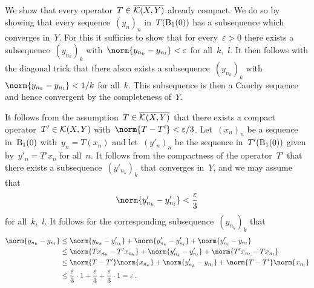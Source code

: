 \section{}





\subsection{}

We show that every operator~$T \in \overline{ \mathcal{K}(X,Y) }$ already compact.
We do so by showing that every sequence~$(y_n)_n$ in~$T(\operatorname{B}_{1}(0))$ has a subsequence which converges in~$Y$.
For this it sufficies to show that for every~$\varepsilon > 0$ there exists a subsequence~$(y_{n_k})_k$ with~$\norm{y_{n_k} - y_{n_l}} < \varepsilon$ for all~$k$,~$l$.
It then follows with the diagonal trick that there alsoa exists a subsequence~$(y_{n_k})_k$ with~$\norm{y_{n_k} - y_{n_l}} < 1/k$ for all~$k$.
This subsequence is then a Cauchy sequence and hence convergent by the completeness of~$Y$.

It follows from the assumption~$T \in \overline{ \mathcal{K}(X,Y) }$ that there exists a compact operator~$T' \in \mathcal{K}(X,Y)$ with~$\norm{T - T'} < \varepsilon / 3$.
Let~$(x_n)_n$ be a sequence in~$\operatorname{B}_{1}(0)$ with~$y_n = T(x_n)$ and let~$(y'_n)_n$ be the sequence in~$T'( \operatorname{B}_{1}(0) )$ given by~$y'_n = T' x_n$ for all~$n$.
It follows from the compactness of the operator~$T'$ that there exists a subsequence~$(y'_{n_k})_k$ that converges in~$Y$, and we may assume that
\[
  \norm{ y'_{n_k} - y'_{n_l} } < \frac{\varepsilon}{3}
\]
for all~$k$,~$l$.
It follows for the corresponding subsequence~$(y_{n_k})_k$ that
\begin{align*}
  \norm{ y_{n_k} - y_{n_l} }
  &\leq
    \norm{ y_{n_k} - y'_{n_k} }
  + \norm{ y'_{n_k} - y'_{n_l} }
  + \norm{ y'_{n_l} - y_{n_l} }
  \\
  &\leq
    \norm{ T x_{n_k} - T' x_{n_k} }
  + \norm{ y'_{n_k} - y'_{n_l} }
  + \norm{ T' x_{n_l} - T x_{n_l} }
  \\
  &\leq
    \norm{T - T'} \norm{x_{n_k}}
  + \norm{ y'_{n_k} - y_{n_l} }
  + \norm{T - T'} \norm{x_{n_l}}
  \\
  &\leq
    \frac{\varepsilon}{3} \cdot 1
  + \frac{\varepsilon}{3}
  + \frac{\varepsilon}{3} \cdot 1
  =
  \varepsilon \,.
\end{align*}




